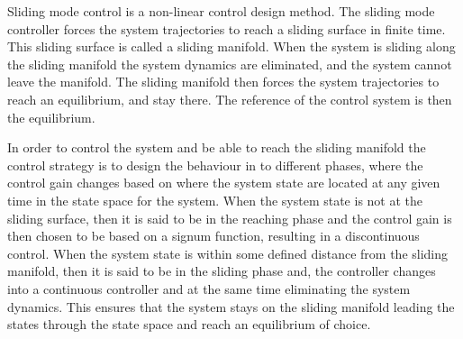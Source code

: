 Sliding mode control is a non-linear control design method. The sliding mode controller forces the system trajectories to
reach a sliding surface in finite time. This sliding surface is called a sliding manifold. When the system is sliding
along the sliding manifold the system dynamics are eliminated, and the system cannot leave the manifold. The sliding
manifold then forces the system trajectories to reach an equilibrium, and stay there. The reference of the control
system is then the equilibrium. 

In order to control the system and be able to reach the sliding manifold the control strategy is to design the behaviour
in to different phases, where the control gain changes based on where the system state are located at any given time in
the state space for the system. When the system state is not at the sliding surface, then it is said to be in the
reaching phase and the control gain is then chosen to be based on a signum function, resulting in a discontinuous control. When the system state is within some defined distance from the sliding manifold, then it is said to be in the
sliding phase and, the controller changes into a continuous controller and at the same time
eliminating the system dynamics. This ensures that the system stays on the sliding manifold leading the states through
the state space and reach an equilibrium of choice.

